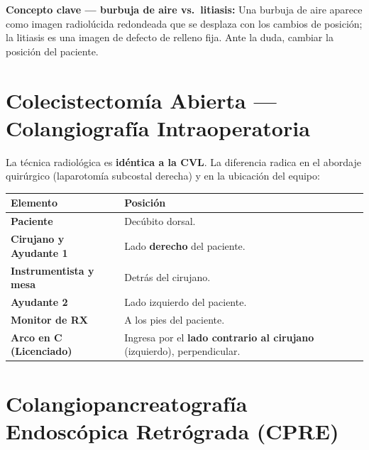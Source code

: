 \vspace{0.5em}

\begin{cajakeypoints}
	\textbf{Concepto clave --- burbuja de aire vs.\ litiasis:} Una burbuja de aire aparece como imagen radiolúcida redondeada que se desplaza con los cambios de posición; la litiasis es una imagen de defecto de relleno fija. Ante la duda, cambiar la posición del paciente.
\end{cajakeypoints}

\section*{Colecistectomía Abierta --- Colangiografía Intraoperatoria}

La técnica radiológica es \textbf{idéntica a la CVL}. La diferencia radica en el abordaje quirúrgico (laparotomía subcostal derecha) y en la ubicación del equipo:

\renewcommand{\arraystretch}{1.3}
\begin{center}
	\begin{tabular}{>{\bfseries}p{4cm} p{9.5cm}}
		\hline
		Elemento & Posición \\
		\hline
		Paciente & Decúbito dorsal. \\
		\hline
		Cirujano y Ayudante 1 & Lado \textbf{derecho} del paciente. \\
		\hline
		Instrumentista y mesa & Detrás del cirujano. \\
		\hline
		Ayudante 2 & Lado izquierdo del paciente. \\
		\hline
		Monitor de RX & A los pies del paciente. \\
		\hline
		Arco en C (Licenciado) & Ingresa por el \textbf{lado contrario al cirujano} (izquierdo), perpendicular. \\
		\hline
	\end{tabular}
\end{center}

\clearpage
\section*{Colangiopancreatografía Endoscópica Retrógrada (CPRE)}


